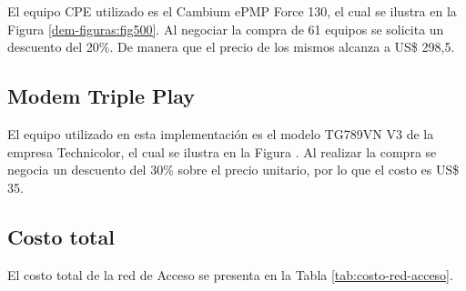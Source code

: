 El equipo CPE utilizado es el Cambium ePMP Force 130, el cual se ilustra en la Figura \ref{dem-figuras:fig500}. Al negociar la compra de 61 equipos se solicita un descuento del 20\%. De manera que el precio de los mismos alcanza a US\$ 298,5.


\subsection{Modem Triple Play}
El equipo utilizado en esta implementación es el modelo TG789VN V3 de la empresa Technicolor, el cual se ilustra en la Figura . Al realizar la compra se negocia un descuento del 30\% sobre el precio unitario, por lo que el costo es US\$ 35.
\subsection{Costo total}
El costo total de la red de Acceso se presenta en la Tabla \ref{tab:costo-red-acceso}.

%

